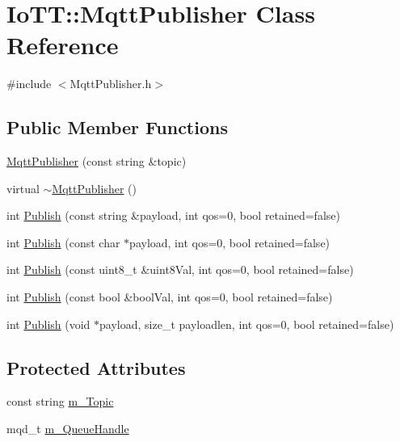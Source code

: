 \hypertarget{classIoTT_1_1MqttPublisher}{}\section{Io\+TT\+:\+:Mqtt\+Publisher Class Reference}
\label{classIoTT_1_1MqttPublisher}


{\ttfamily \#include $<$Mqtt\+Publisher.\+h$>$}

\subsection*{Public Member Functions}
\begin{DoxyCompactItemize}
\item 
\hyperlink{classIoTT_1_1MqttPublisher_a5b41e02b5f6d9c1ba2dad863b5f80ce6}{Mqtt\+Publisher} (const string \&topic)
\item 
virtual \hyperlink{classIoTT_1_1MqttPublisher_ab533cffa75ed108d360dbcdad93b65d7}{$\sim$\+Mqtt\+Publisher} ()
\item 
int \hyperlink{classIoTT_1_1MqttPublisher_a038d355fb4e0b9478562e0faa54c3288}{Publish} (const string \&payload, int qos=0, bool retained=false)
\item 
int \hyperlink{classIoTT_1_1MqttPublisher_a6f208fee8b6d2942e28dfaffd4d80ca0}{Publish} (const char $\ast$payload, int qos=0, bool retained=false)
\item 
int \hyperlink{classIoTT_1_1MqttPublisher_ab85025b01adf841ab6734e3099ed6f49}{Publish} (const uint8\+\_\+t \&uint8\+Val, int qos=0, bool retained=false)
\item 
int \hyperlink{classIoTT_1_1MqttPublisher_a18f8add5856c995a270848a1bfecce24}{Publish} (const bool \&bool\+Val, int qos=0, bool retained=false)
\item 
int \hyperlink{classIoTT_1_1MqttPublisher_a1d86c942d392bb28b2715380cf88bf71}{Publish} (void $\ast$payload, size\+\_\+t payloadlen, int qos=0, bool retained=false)
\end{DoxyCompactItemize}
\subsection*{Protected Attributes}
\begin{DoxyCompactItemize}
\item 
const string \hyperlink{classIoTT_1_1MqttPublisher_a921c6d3cff38da77e674f04a2b9cd0f3}{m\+\_\+\+Topic}
\item 
mqd\+\_\+t \hyperlink{classIoTT_1_1MqttPublisher_a82e5135a1270e1c2d8a923e042edd05a}{m\+\_\+\+Queue\+Handle}
\end{DoxyCompactItemize}


